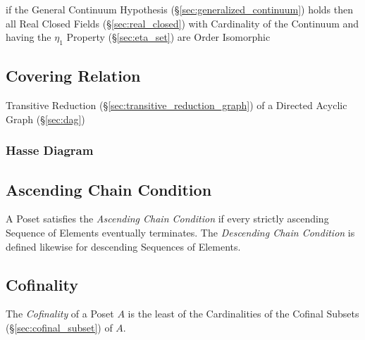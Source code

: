 if the General Continuum Hypothesis (\S\ref{sec:generalized_continuum}) holds
then all Real Closed Fields (\S\ref{sec:real_closed}) with Cardinality of the
Continuum and having the $\eta_1$ Property (\S\ref{sec:eta_set}) are Order
Isomorphic



\subsection{Covering Relation}\label{sec:covering_relation}

Transitive Reduction (\S\ref{sec:transitive_reduction_graph}) of a
Directed Acyclic Graph (\S\ref{sec:dag})



\subsubsection{Hasse Diagram}\label{sec:hasse_diagram}



\subsection{Ascending Chain Condition}\label{sec:ascending_chain}

A Poset satisfies the \emph{Ascending Chain Condition} if every
strictly ascending Sequence of Elements eventually terminates. The
\emph{Descending Chain Condition} is defined likewise for descending
Sequences of Elements.



\subsection{Cofinality}\label{sec:cofinality}

The \emph{Cofinality} of a Poset $A$ is the least of the Cardinalities
of the Cofinal Subsets (\S\ref{sec:cofinal_subset}) of $A$.



